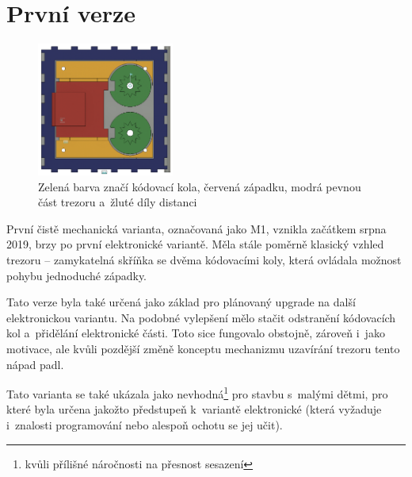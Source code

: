 \section{První verze}
\label{M1-vyvoj}

\begin{figure}
    \centering
    \includegraphics[width=0.4\textwidth]{kapitoly/obrazky/M1/mechanizmus.png}
    \caption{Zelená barva značí kódovací kola, červená západku, modrá pevnou část trezoru a~žluté díly distanci \centering}
    \label{fig:M1-mechanizmus}
\end{figure}
První čistě mechanická varianta, označovaná jako M1, vznikla začátkem srpna 2019, brzy po první  elektronické variantě.
Měla stále poměrně klasický vzhled trezoru -- zamykatelná skříňka se dvěma  kódovacími koly, která ovládala možnost pohybu jednoduché západky.

Tato verze byla také určená jako základ pro plánovaný upgrade na další elektronickou
variantu. Na podobné vylepšení mělo stačit odstranění kódo\-va\-cích kol a~přidělání elektronické části. Toto sice fungovalo obstojně, zároveň 
i~jako motivace, ale kvůli pozdější změně konceptu mechanizmu uzavírání trezoru tento nápad padl.

Tato varianta se také ukázala jako nevhodná\footnote{kvůli přílišné náročnosti na přesnost sesazení} pro stavbu s~malými dětmi, 
pro které byla určena jakožto předstupeň k~variantě elektronické (která vyžaduje i~znalosti programování nebo alespoň ochotu se jej  učit).